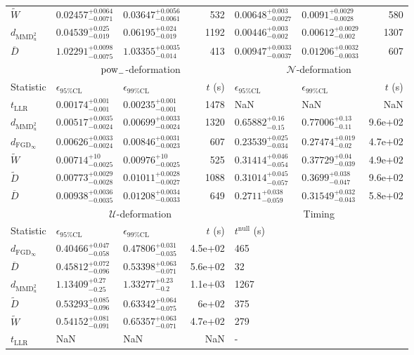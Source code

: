 \begin{tabular}{l|llr|llr}
	$\widetilde{W}$ & $0.02457_{-0.0071}^{+0.0064}$ & $0.03647_{-0.0061}^{+0.0056}$ & 532 & $0.00648_{-0.0027}^{+0.003}$ & $0.0091_{-0.0028}^{+0.0029}$ & 580 \\
	$d_{\mathrm{MMD}^{2}_{u}}$ & $0.04539_{-0.019}^{+0.025}$ & $0.06195_{-0.019}^{+0.024}$ & 1192 & $0.00446_{-0.002}^{+0.003}$ & $0.00612_{-0.002}^{+0.0029}$ & 1307 \\
	$\overline{D}$ & $1.02291_{-0.0075}^{+0.0098}$ & $1.03355_{-0.014}^{+0.0035}$ & 413 & $0.00947_{-0.0037}^{+0.0033}$ & $0.01206_{-0.0033}^{+0.0032}$ & 607 \\
	\toprule
	\multicolumn{1}{c}{} & \multicolumn{3}{c}{$\rm{pow}_{-}$-deformation} & \multicolumn{3}{c}{$\mathcal{N}$-deformation} \\
	Statistic & $\epsilon_{95\%\mathrm{CL}}$ & $\epsilon_{99\%\mathrm{CL}}$ & $t$ (s) & $\epsilon_{95\%\mathrm{CL}}$ & $\epsilon_{99\%\mathrm{CL}}$ & $t$ (s) \\
	\midrule
	$t_{\mathrm{LLR}}$ & $0.00174_{-0.001}^{+0.001}$ & $0.00235_{-0.001}^{+0.001}$ & 1478 & NaN & NaN & NaN \\
	$d_{\mathrm{MMD}^{2}_{u}}$ & $0.00517_{-0.0024}^{+0.0035}$ & $0.00699_{-0.0024}^{+0.0033}$ & 1320 & $0.65882_{-0.15}^{+0.16}$ & $0.77006_{-0.11}^{+0.13}$ & 9.6e+02 \\
	$d_{\mathrm{FGD}_{\infty}}$ & $0.00626_{-0.0024}^{+0.0033}$ & $0.00846_{-0.0023}^{+0.0031}$ & 607 & $0.23539_{-0.034}^{+0.025}$ & $0.27474_{-0.02}^{+0.019}$ & 4.7e+02 \\
	$\widetilde{W}$ & $0.00714_{-0.0025}^{+10}$ & $0.00976_{-0.0025}^{+10}$ & 525 & $0.31414_{-0.054}^{+0.046}$ & $0.37729_{-0.039}^{+0.04}$ & 4.9e+02 \\
	$\widetilde{D}$ & $0.00773_{-0.0028}^{+0.0029}$ & $0.01011_{-0.0027}^{+0.0028}$ & 1088 & $0.31014_{-0.057}^{+0.045}$ & $0.3699_{-0.047}^{+0.038}$ & 9.6e+02 \\
	$\overline{D}$ & $0.00938_{-0.0035}^{+0.0036}$ & $0.01208_{-0.0033}^{+0.0034}$ & 649 & $0.2711_{-0.059}^{+0.038}$ & $0.31549_{-0.043}^{+0.032}$ & 5.8e+02 \\
	\toprule
	\multicolumn{1}{c}{} & \multicolumn{3}{c}{$\mathcal{U}$-deformation} & \multicolumn{3}{c}{Timing} \\
	Statistic & $\epsilon_{95\%\mathrm{CL}}$ & $\epsilon_{99\%\mathrm{CL}}$ & $t$ (s) & $t^{\mathrm{null}}$ (s) \\
	\midrule
	$d_{\mathrm{FGD}_{\infty}}$ & $0.40466_{-0.058}^{+0.047}$ & $0.47806_{-0.035}^{+0.031}$ & 4.5e+02 & 465 \\
	$\overline{D}$ & $0.45812_{-0.096}^{+0.072}$ & $0.53398_{-0.071}^{+0.063}$ & 5.6e+02 & 32 \\
	$d_{\mathrm{MMD}^{2}_{u}}$ & $1.13409_{-0.25}^{+0.27}$ & $1.33277_{-0.2}^{+0.23}$ & 1.1e+03 & 1267 \\
	$\widetilde{D}$ & $0.53293_{-0.096}^{+0.085}$ & $0.63342_{-0.075}^{+0.064}$ & 6e+02 & 375 \\
	$\widetilde{W}$ & $0.54152_{-0.091}^{+0.081}$ & $0.65357_{-0.071}^{+0.063}$ & 4.7e+02 & 279 \\
	$t_{\mathrm{LLR}}$ & NaN & NaN & NaN & - \\
	\bottomrule
\end{tabular}
